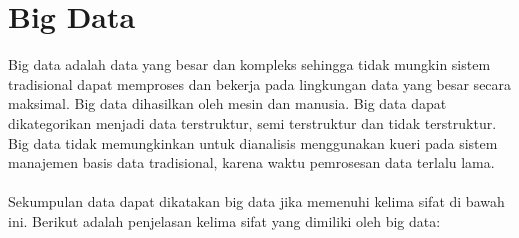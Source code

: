 \section{Big Data}
Big data adalah data yang besar dan kompleks sehingga tidak mungkin sistem tradisional dapat memproses dan bekerja pada lingkungan data yang besar secara maksimal. Big data dihasilkan oleh mesin dan manusia. Big data dapat dikategorikan menjadi data terstruktur, semi terstruktur dan tidak terstruktur. Big data tidak memungkinkan untuk dianalisis menggunakan kueri pada sistem manajemen basis data tradisional, karena waktu pemrosesan data terlalu lama.
\\\\
Sekumpulan data dapat dikatakan big data jika memenuhi  kelima sifat di bawah ini. Berikut adalah penjelasan kelima sifat yang dimiliki oleh big data:
